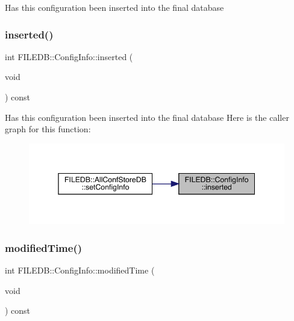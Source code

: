 Has this configuration been inserted into the final database \mbox{\label{classFILEDB_1_1ConfigInfo_a45cc2aa85de0ccd89c06989bb9cff843}} 
\subsubsection{\texorpdfstring{inserted()}{inserted()}\hspace{0.1cm}{\footnotesize\ttfamily [2/2]}}
{\footnotesize\ttfamily int F\+I\+L\+E\+D\+B\+::\+Config\+Info\+::inserted (\begin{DoxyParamCaption}\item[{void}]{ }\end{DoxyParamCaption}) const}

Has this configuration been inserted into the final database Here is the caller graph for this function\+:\nopagebreak
\begin{figure}[H]
\begin{center}
\leavevmode
\includegraphics[width=345pt]{d0/d90/classFILEDB_1_1ConfigInfo_a45cc2aa85de0ccd89c06989bb9cff843_icgraph}
\end{center}
\end{figure}
\mbox{\label{classFILEDB_1_1ConfigInfo_a03212f15d26edbae21ea53bbce2b1793}} 
\subsubsection{\texorpdfstring{modifiedTime()}{modifiedTime()}\hspace{0.1cm}{\footnotesize\ttfamily [1/4]}}
{\footnotesize\ttfamily int F\+I\+L\+E\+D\+B\+::\+Config\+Info\+::modified\+Time (\begin{DoxyParamCaption}\item[{void}]{ }\end{DoxyParamCaption}) const}

